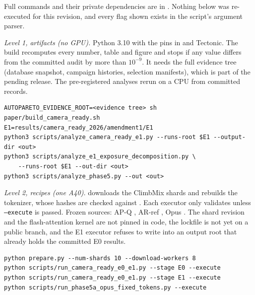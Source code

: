 Full commands and their private dependencies are in . Nothing below was re-executed for this revision, and every flag shown exists in the script's argument parser.

\emph{Level 1, artifacts (no GPU).} Python 3.10 with the pins in  and Tectonic. The build recomputes every number, table and figure and stops if any value differs from the committed audit by more than $10^{-9}$. It needs the full evidence tree (database snapshot, campaign histories, selection manifests), which is part of the pending release. The pre-registered analyses rerun on a CPU from committed records.
\begingroup\footnotesize
\begin{verbatim}
AUTOPARETO_EVIDENCE_ROOT=<evidence tree> sh paper/build_camera_ready.sh
E1=results/camera_ready_2026/amendment1/E1
python3 scripts/analyze_camera_ready_e1.py --runs-root $E1 --output-dir <out>
python3 scripts/analyze_e1_exposure_decomposition.py \
    --runs-root $E1 --out-dir <out>
python3 scripts/analyze_phase5.py --out <out>
\end{verbatim}
\endgroup

\emph{Level 2, recipes (one A40).}  downloads the ClimbMix shards and rebuilds the tokenizer, whose hashes are checked against . Each executor only validates unless \texttt{--execute} is passed. Frozen sources: AP-Q , AR-ref , Opus . The shard revision and the flash-attention kernel are not pinned in code, the lockfile is not yet on a public branch, and the E1 executor refuses to write into an output root that already holds the committed E0 results.
\begingroup\footnotesize
\begin{verbatim}
python prepare.py --num-shards 10 --download-workers 8
python scripts/run_camera_ready_e0_e1.py --stage E0 --execute
python scripts/run_camera_ready_e0_e1.py --stage E1 --execute
python scripts/run_phase5a_opus_fixed_tokens.py --execute
\end{verbatim}
\endgroup

